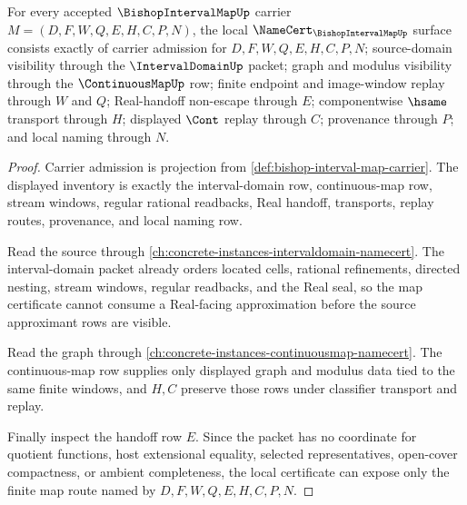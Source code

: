 \begin{theorem}
\label{thm:bishop-interval-map-namecert-obligations}
For every accepted $\BishopIntervalMapUp$ carrier $M=(D,F,W,Q,E,H,C,P,N)$, the local $\NameCert_{\BishopIntervalMapUp}$ surface consists exactly of carrier admission for $D,F,W,Q,E,H,C,P,N$; source-domain visibility through the $\IntervalDomainUp$ packet; graph and modulus visibility through the $\ContinuousMapUp$ row; finite endpoint and image-window replay through $W$ and $Q$; Real-handoff non-escape through $E$; componentwise $\hsame$ transport through $H$; displayed $\Cont$ replay through $C$; provenance through $P$; and local naming through $N$.
\end{theorem}
\begin{proof}
Carrier admission is projection from \autoref{def:bishop-interval-map-carrier}. The displayed inventory is exactly the interval-domain row, continuous-map row, stream windows, regular rational readbacks, Real handoff, transports, replay routes, provenance, and local naming row.

Read the source through \autoref{ch:concrete-instances-intervaldomain-namecert}. The interval-domain packet already orders located cells, rational refinements, directed nesting, stream windows, regular readbacks, and the Real seal, so the map certificate cannot consume a Real-facing approximation before the source approximant rows are visible.

Read the graph through \autoref{ch:concrete-instances-continuousmap-namecert}. The continuous-map row supplies only displayed graph and modulus data tied to the same finite windows, and $H,C$ preserve those rows under classifier transport and replay.

Finally inspect the handoff row $E$. Since the packet has no coordinate for quotient functions, host extensional equality, selected representatives, open-cover compactness, or ambient completeness, the local certificate can expose only the finite map route named by $D,F,W,Q,E,H,C,P,N$.
\end{proof}


